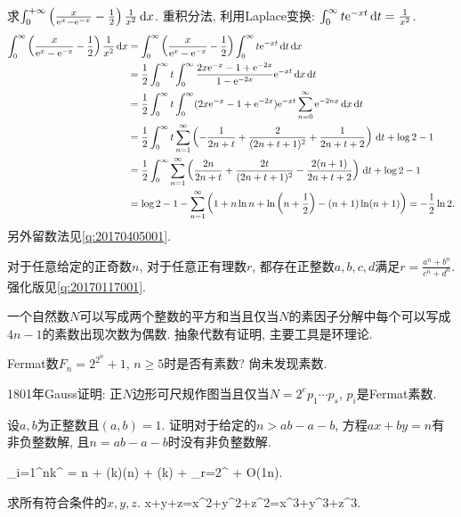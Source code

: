 求$\int_0^{+\infty}\left(\frac{x}{\mathrm{e}^x-\mathrm{e}^{-x}}-\frac12\right)\frac1{x^2}\,\mathrm{d} x$.
\eu
\ba
重积分法, 利用Laplace变换: $\int_0^{\infty}t\mathrm{e}^{-xt}\,\mathrm{d} t=\frac{1}{x^2}$.
\begin{align*}
 \int_{0}^{\infty}\left(\frac{x}{\mathrm{e}^x-\mathrm{e}^{-x}}-\frac{1}{2}\right)\frac{1}{x^2}\,\mathrm{d} x
  & = \int_0^{\infty}\left(\frac{x}{\mathrm{e}^x-\mathrm{e}^{-x}}-\frac{1}{2}\right)\int_{0}^{\infty}t\mathrm{e}^{-xt}\,\mathrm{d} t\,\mathrm{d} x\\
  & =\frac{1}{2}\int_{0}^{\infty}t\int_{0}^{\infty}\frac{2x\mathrm{e}^{-x}-1+\mathrm{e}^{-2x}}{1-\mathrm{e}^{-2x}}\mathrm{e}^{-xt}\,\mathrm{d} x\,\mathrm{d} t\\
  & = \frac{1}{2}\int_0^{\infty}t\int_0^{\infty}(2x\mathrm{e}^{-x}-1+\mathrm{e}^{-2x})\mathrm{e}^{-xt}\sum_{n=0}^{\infty}\mathrm{e}^{-2nx}\,\mathrm{d} x\,\mathrm{d} t\\
  & = \frac{1}{2}\int_0^{\infty}t\sum_{n=1}^{\infty}\left(-\frac{1}{2n+t}+\frac{2}{(2n+t+1)^2}+\frac{1}{2n+t+2}\right)\,\mathrm{d} t+\log 2-1\\
  & = \frac{1}{2}\int_0^{\infty}\sum_{n=1}^{\infty}\left(\frac{2n}{2n+t}+\frac{2t}{(2n+t+1)^2}-\frac{2(n+1)}{2n+t+2}\right)\,\mathrm{d} t + \log 2 -1\\
  & = \log 2-1-\sum_{n=1}^{\infty}\left(1+n\ln n+\ln\left(n+\frac12\right)-(n+1)\ln(n+1)\right)=-\frac12\ln 2.
\end{align*}
另外留数法见\ref{q:20170405001}.
\ea

对于任意给定的正奇数$n$, 对于任意正有理数$r$, 都存在正整数$a,b,c,d$满足$r=\frac{a^n+b^n}{c^n+d^n}$. 强化版见\ref{q:20170117001}.
\eu

一个自然数$N$可以写成两个整数的平方和当且仅当$N$的素因子分解中每个可以写成$4n-1$的素数出现次数为偶数.
\eu
\ba
抽象代数有证明, 主要工具是环理论.
\ea

\bu{}{}
Fermat数$F_n=2^{2^n}+1$, $n\ge5$时是否有素数? 尙未发现素数.

1801年Gauss证明: 正$N$边形可尺规作图当且仅当$N=2^e p_1\cdots p_s$, $p_i$是Fermat素数.
\eu

\bu{}{}
设$a, b$为正整数且$(a,b)=1$. 证明对于给定的$n>ab-a-b$, 方程$ax+by=n$有非负整数解, 且$n=ab-a-b$时没有非负整数解.
\eu

\bee
\sum_{i=1}^{n}k^{} = n + \ln(k)\ln(n) + \gamma\ln(k) + \sum_{r=2}^{\infty} + O\left(\frac1n\right).
\eee
\eu

求所有符合条件的$x, y, z$.
\bee
x+y+z=x^2+y^2+z^2=x^3+y^3+z^3.
\eee
\eu

